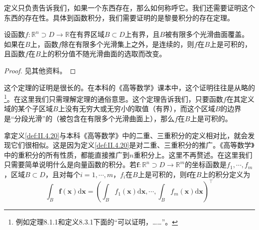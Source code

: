 \documentclass[../main.tex]{subfiles}
\begin{document}
定义只负责告诉我们，如果一个东西存在，那么如何称呼它。我们还需要证明这个东西的存在性。具体到函数积分，我们需要证明的是黎曼积分的存在定理。

\begin{theorem}[黎曼积分的存在定理]\label{thm:II.4.14}
    设函数$f:\mathbb{R}^n\supset D\rightarrow\mathbb{R}$在有界区域$B\subset D$上有界，且$B$被有限多个光滑曲面覆盖。如果在$B$上，函数$f$除在有限多个光滑集上之外，是连续的，则$f$在$B$上是可积的，且函数$f$在$B$上的积分值不随光滑曲面的选取而改变。
\end{theorem}
\begin{proof}
    见其他资料\cite[Appendix 8]{Williamson1972}。
\end{proof}

这个定理的证明是很长的。在本科的《高等数学》课本中，这个证明往往是从略的\footnote{例如定理8.1.1和定义8.3.1下面的“可以证明，……”\cite[\S 8]{华工高数2009下}。}。在这里我们只需理解定理的通俗意思。这个定理告诉我们，只要函数$f$在其定义域的某个子区域$B$上没有无穷大或无穷小的取值（有界），而这个区域$B$的边界是“分段光滑”的（被包含在有限多个光滑曲面上），那么$f$在$B$上是可积的。

拿定义\ref{def:II.4.20}与本科《高等数学》中的二重、三重积分的定义相对比，就会发现它们很相似。这是因为定义\ref{def:II.4.20}是对二重、三重积分的推广。《高等数学》中的重积分的所有性质，都能直接推广到$n$重积分上。这里不再赘述。在这里我们只需要简单说明什么是向量函数的积分。若$\mathbf{f}:\mathbb{R}^n\supset D\rightarrow\mathbb{R}^m$的坐标函数是$f_1,\cdots,f_m$，区域$B\subset D$，且对每个$i=1,\cdots,m$，$f_i$在$B$上是可积的，则$\mathbf{f}$在$B$上的积分定义为
\[\int_B\mathbf{f}\left(\mathbf{x}\right)\mathrm{d}\mathbf{x}=\left(\int_B f_1\left(\mathbf{x}\right)\mathrm{d}\mathbf{x},\cdots,\int_B f_m\left(\mathbf{x}\right)\mathrm{d}\mathbf{x}\right)^\intercal\]
\end{document}
